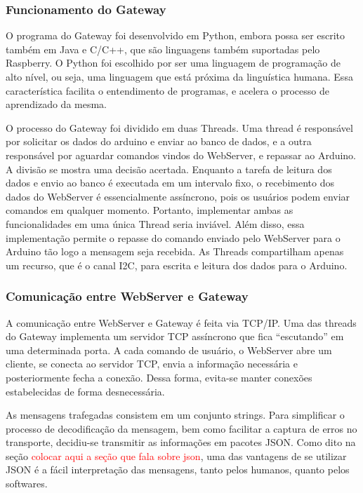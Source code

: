			\subsubsection{Funcionamento do Gateway}
				O programa do Gateway foi desenvolvido em Python, embora possa ser escrito também em Java e C/C++, que são linguagens também suportadas pelo Raspberry. O Python foi escolhido por ser uma linguagem de programação de alto nível, ou seja, uma linguagem que está próxima da linguística humana. Essa característica facilita o entendimento de programas, e acelera o processo de aprendizado da mesma.
				
				O processo do Gateway foi dividido em duas Threads. Uma thread é responsável por solicitar os dados do arduino e enviar ao banco de dados, e a outra responsável por aguardar comandos vindos do WebServer, e repassar ao Arduino. A divisão se mostra uma decisão acertada. Enquanto a tarefa de leitura dos dados e envio ao banco é executada em um intervalo fixo, o recebimento dos dados do WebServer é essencialmente assíncrono, pois os usuários podem enviar comandos em qualquer momento. Portanto, implementar ambas as funcionalidades em uma única Thread seria inviável. Além disso, essa implementação permite o repasse do comando enviado pelo WebServer para o Arduino tão logo a mensagem seja recebida. As Threads compartilham apenas um recurso, que é o canal I2C, para escrita e leitura dos dados para o Arduino.
			
			\subsubsection{Comunicação entre WebServer e Gateway}
				A comunicação entre WebServer e Gateway é feita via TCP/IP. Uma das threads do Gateway implementa um servidor TCP assíncrono que fica ``escutando'' em uma determinada porta. A cada comando de usuário, o WebServer abre um cliente, se conecta ao servidor TCP, envia a informação necessária e posteriormente fecha a conexão. Dessa forma, evita-se manter conexões estabelecidas de forma desnecessária.
				
				As mensagens trafegadas consistem em um conjunto strings. Para simplificar o processo de decodificação da mensagem, bem como facilitar a captura de erros no transporte, decidiu-se transmitir as informações em pacotes JSON. Como dito na seção \textcolor{red}{colocar aqui a seção que fala sobre json}, uma das vantagens de se utilizar JSON é a fácil interpretação das mensagens, tanto pelos humanos, quanto pelos softwares.
				
